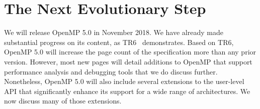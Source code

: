 \section{The Next Evolutionary Step}
\label{sec:in_progress}

We will release OpenMP 5.0 in November 2018. We have already made 
substantial progress on its content, as TR6~\cite{openmptr6} demonstrates.
Based on TR6, OpenMP 5.0 will increase the page count of the specification 
more than any prior version. However, most new pages will detail additions 
to OpenMP that support performance analysis and debugging tools that we do
discuss further. Nonetheless, OpenMP 5.0 will also include several extensions 
to the user-level API that significantly enhance its support for a wide 
range of architectures. We now discuss many of those extensions.









   

